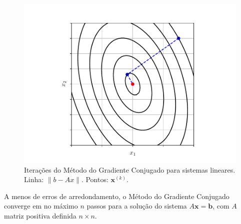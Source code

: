 \begin{figure}[H]
  \centering
  \includegraphics[width=\textwidth]{./cap_sislin/dados/fig_mgc/fig}
  \caption{Iterações do Método do Gradiente Conjugado para sistemas lineares. Linha: $\|b-Ax\|$. Pontos: $\pmb{x}^{(k)}$.}
  \label{cap_sislin_sec_metgc:fig:cap_sislin_sec_mgc}
\end{figure}

\begin{obs}
  A menos de erros de arredondamento, o Método do Gradiente Conjugado converge em no máximo $n$ passos para a solução do sistema $A\pmb{x} = \pmb{b}$, com $A$ matriz positiva definida $n\times n$.
\end{obs}



